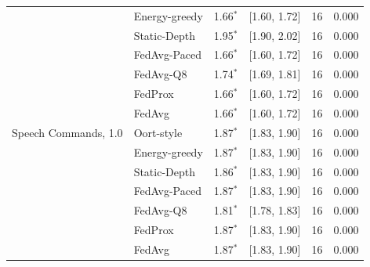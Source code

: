\begin{tabular}{@{}llrrrr@{}}
 & Energy-greedy & 1.66$^{*}$ & [1.60, 1.72] & 16 & 0.000\\
 & Static-Depth & 1.95$^{*}$ & [1.90, 2.02] & 16 & 0.000\\
 & FedAvg-Paced & 1.66$^{*}$ & [1.60, 1.72] & 16 & 0.000\\
 & FedAvg-Q8 & 1.74$^{*}$ & [1.69, 1.81] & 16 & 0.000\\
 & FedProx & 1.66$^{*}$ & [1.60, 1.72] & 16 & 0.000\\
 & FedAvg & 1.66$^{*}$ & [1.60, 1.72] & 16 & 0.000\\
\midrule
Speech Commands, 1.0 & Oort-style & 1.87$^{*}$ & [1.83, 1.90] & 16 & 0.000\\
 & Energy-greedy & 1.87$^{*}$ & [1.83, 1.90] & 16 & 0.000\\
 & Static-Depth & 1.86$^{*}$ & [1.83, 1.90] & 16 & 0.000\\
 & FedAvg-Paced & 1.87$^{*}$ & [1.83, 1.90] & 16 & 0.000\\
 & FedAvg-Q8 & 1.81$^{*}$ & [1.78, 1.83] & 16 & 0.000\\
 & FedProx & 1.87$^{*}$ & [1.83, 1.90] & 16 & 0.000\\
 & FedAvg & 1.87$^{*}$ & [1.83, 1.90] & 16 & 0.000\\
\bottomrule
\end{tabular}